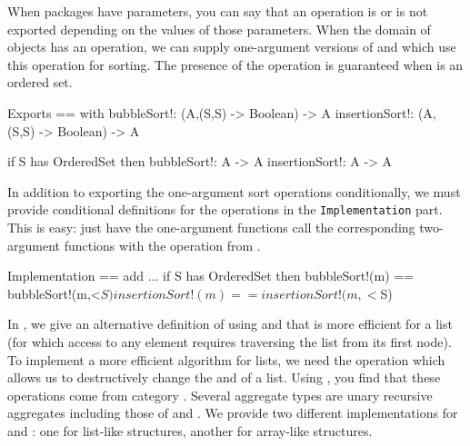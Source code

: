 %
When packages have parameters, you can say that an operation is or is not
exported depending on the values of those parameters.
When the domain of objects  has an \spadop{<}
operation, we can supply one-argument versions of
 and  which use this operation
for sorting.
The presence of the
operation \spadop{<} is guaranteed when  is an ordered set.

\begin{xmpLines}
Exports == with
    bubbleSort!: (A,(S,S) -> Boolean) -> A
    insertionSort!: (A, (S,S) -> Boolean) -> A

    if S has OrderedSet then
      bubbleSort!: A -> A
      insertionSort!: A -> A
\end{xmpLines}

In addition to exporting the one-argument sort operations
conditionally, we must provide conditional definitions for the
operations in the {\tt Implementation} part.
This is easy: just have the one-argument functions call the
corresponding two-argument functions with the operation
\spadop{<} from .

\begin{xmpLines}
  Implementation == add
       ...
    if S has OrderedSet then
      bubbleSort!(m) == bubbleSort!(m,<$S)
      insertionSort!(m) == insertionSort!(m,<$S)
\end{xmpLines}

In , we give an alternative definition of
 using  and
 that is more efficient for a list (for
which access to any element requires traversing the list from its
first node).
To implement a more efficient algorithm for lists, we need the
operation  which allows us to destructively change
the  and  of a list.
Using \Browse{}, you find that these operations come from category
.
Several aggregate types are unary recursive aggregates including
those of  and .
We provide two different implementations for
 and : one
for list-like structures, another for array-like structures.

